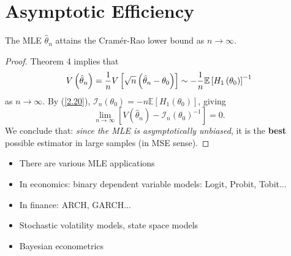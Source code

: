\documentclass[notes=show]{beamer}
\begin{document}
\section{Asymptotic Efficiency}

\begin{frame}%


\begin{corollary}
The MLE $\hat{\theta}_{n}$ attains the Cram\'{e}r-Rao lower bound as $%
n\rightarrow \infty $.
\end{corollary}

\begin{proof}
Theorem 4 implies that%
\begin{equation*}
V\left( \hat{\theta}_{n}\right) =\frac{1}{n}V\left[ \sqrt{n}\left( \hat{%
\theta}_{n}-\theta _{0}\right) \right] \sim -\frac{1}{n}\mathbb{E}\left[
H_{1}\left( \theta _{0}\right) \right] ^{-1}
\end{equation*}%
as $n\rightarrow \infty $. By (\ref{2.20}), $\mathcal{I}_{n}\left( \theta
_{0}\right) =-n\mathbb{E}\left[ H_{1}\left( \theta _{0}\right) \right] $,
giving%
\begin{equation*}
\lim_{n\rightarrow \infty }\left[ V\left( \hat{\theta}_{n}\right) -\mathcal{I%
}_{n}\left( \theta _{0}\right) ^{-1}\right] =0.
\end{equation*}%
We conclude that: \textit{since the MLE is asymptotically unbiased}, it is
the \textbf{best} possible estimator in large samples (in MSE sense).
\end{proof}

\end{frame}%

\begin{frame}%


\begin{itemize}
\item There are various MLE applications

\item In economics: binary dependent variable models: Logit, Probit, Tobit...

\item In finance: ARCH, GARCH...

\item Stochastic volatility models, state space models

\item Bayesian econometrics
\end{itemize}

\end{frame}%
\end{document}

